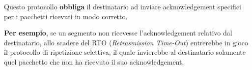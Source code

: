 \documentclass[a4paper]{article}
\begin{document}
	\noindent
	Questo protocollo \textbf{obbliga} il destinatario ad inviare acknowledgement specifici per i pacchetti ricevuti in modo corretto.\newline
	
	\noindent
	\textbf{Per esempio}, se un segmento non ricevesse l’acknowledgement relativo dal destinatario, allo scadere del RTO (\emph{Retrasmission Time-Out}) entrerebbe in gioco il protocollo di ripetizione selettiva, il quale invierebbe al destinatario solamente quel pacchetto che non ha ricevuto il suo acknowledgement.
\end{document}
